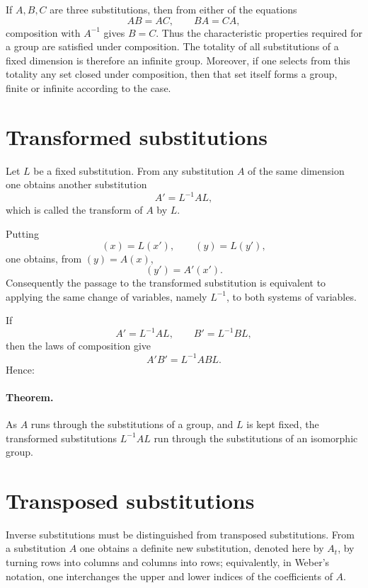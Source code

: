 \documentclass[11pt,a4paper]{book}
\begin{document}
If $A,B,C$ are three substitutions, then from either of the equations
\[
AB=AC,\qquad BA=CA,
\]
composition with $A^{-1}$ gives $B=C$.  Thus the characteristic properties required for a group are satisfied under composition.  The totality of all substitutions of a fixed dimension is therefore an infinite group.  Moreover, if one selects from this totality any set closed under composition, then that set itself forms a group, finite or infinite according to the case.

\section*{Transformed substitutions}
Let $L$ be a fixed substitution.  From any substitution $A$ of the same dimension one obtains another substitution
\begin{equation}\label{eq:weber8-transform}
A'=L^{-1}AL,
\end{equation}
which is called the transform of $A$ by $L$.

Putting
\begin{equation}\label{eq:weber8-variable-transform}
(x)=L(x'),\qquad (y)=L(y'),
\end{equation}
one obtains, from $(y)=A(x)$,
\begin{equation}\label{eq:weber8-transformed-action}
(y')=A'(x').
\end{equation}
Consequently the passage to the transformed substitution is equivalent to applying the same change of variables, namely $L^{-1}$, to both systems of variables.

If
\[
A'=L^{-1}AL,
\qquad
B'=L^{-1}BL,
\]
then the laws of composition give
\[
A'B'=L^{-1}ABL.
\]
Hence:

\paragraph{Theorem.} As $A$ runs through the substitutions of a group, and $L$ is kept fixed, the transformed substitutions $L^{-1}AL$ run through the substitutions of an isomorphic group.

\section*{Transposed substitutions}
Inverse substitutions must be distinguished from transposed substitutions.  From a substitution $A$ one obtains a definite new substitution, denoted here by $A_t$, by turning rows into columns and columns into rows; equivalently, in Weber's notation, one interchanges the upper and lower indices of the coefficients of $A$.
\end{document}
